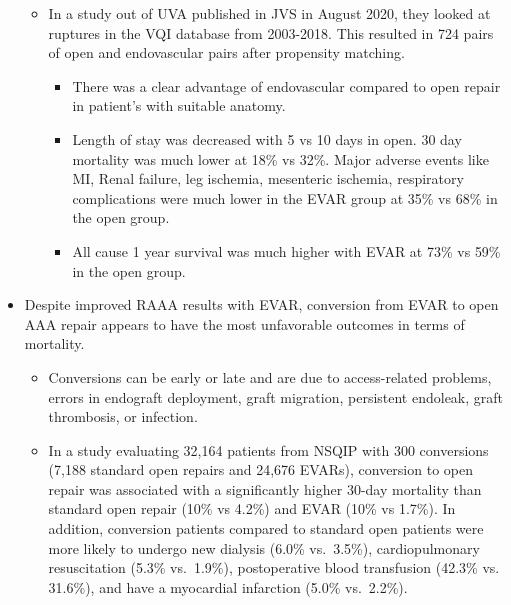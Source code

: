 \documentclass[
]{book}
\begin{document}
\begin{itemize}
  \begin{itemize}
  \item
    In a study out of UVA published in JVS in August 2020, they
    looked at ruptures in the VQI database from 2003-2018. This
    resulted in 724 pairs of open and endovascular pairs after
    propensity matching. \citep{wangEndovascularRepairRuptured2020a}

    \begin{itemize}
    \item
      There was a clear advantage of endovascular compared to open
      repair in patient's with suitable anatomy.
    \item
      Length of stay was decreased with 5 vs 10 days in open. 30
      day mortality was much lower at 18\% vs 32\%. Major adverse
      events like MI, Renal failure, leg ischemia, mesenteric
      ischemia, respiratory complications were much lower in the
      EVAR group at 35\% vs 68\% in the open group.
    \item
      All cause 1 year survival was much higher with EVAR at 73\%
      vs 59\% in the open group.
    \end{itemize}
  \end{itemize}
\item
  Despite improved RAAA results with EVAR, conversion from EVAR to
  open AAA repair appears to have the most unfavorable outcomes in
  terms of mortality.

  \begin{itemize}
  \item
    Conversions can be early or late and are due to access-related
    problems, errors in endograft deployment, graft migration,
    persistent endoleak, graft thrombosis, or infection.
  \item
    In a study evaluating 32,164 patients from NSQIP with 300
    conversions (7,188 standard open repairs and 24,676 EVARs),
    conversion to open repair was associated with a significantly
    higher 30-day mortality than standard open repair (10\% vs 4.2\%)
    and EVAR (10\% vs 1.7\%). In addition, conversion patients
    compared to standard open patients were more likely to undergo
    new dialysis (6.0\% vs.~3.5\%), cardiopulmonary resuscitation
    (5.3\% vs.~1.9\%), postoperative blood transfusion (42.3\% vs.
    31.6\%), and have a myocardial infarction (5.0\% vs.~2.2\%).
    \citep{ulteeConversionEVAROpen2016}
  \end{itemize}
\end{itemize}
\end{document}
